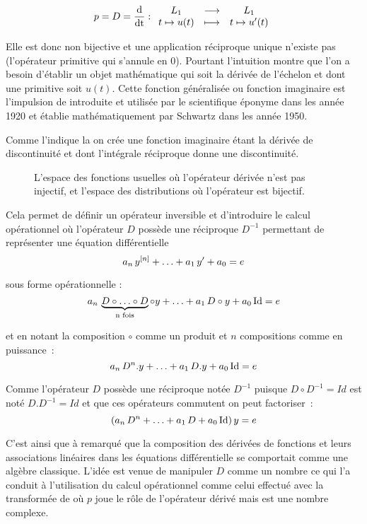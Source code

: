 \begin{equation}
  \label{eq:application_derivee}
  p=D=\frac{\mathrm{d{}}}{\mathrm{d{t}}} : \begin{array}{ccc} L_1 & \longrightarrow & L_1 \\ t\mapsto u(t) & \longmapsto & t\mapsto u'(t) \\ \end{array}
\end{equation}


Elle est donc non bijective et une application réciproque unique
n'existe pas (l'opérateur primitive qui s'annule en 0). Pourtant
l'intuition montre que l'on a besoin d'établir un objet mathématique
qui soit la dérivée de l'échelon et dont une primitive soit
$u(t)$. Cette fonction généralisée ou fonction imaginaire est
l'impulsion de \Dirac{} introduite et utilisée par le scientifique
éponyme dans les année 1920 et établie mathématiquement par Schwartz
dans les année 1950.

Comme l'indique la  on crée une
fonction imaginaire étant la dérivée de discontinuité et dont
l'intégrale réciproque donne une discontinuité.
\begin{figure}[ht!]
  \centering
  \caption{L'espace des fonctions usuelles où l'opérateur dérivée n'est pas injectif, et l'espace des distributions où l'opérateur est bijectif. }
  \label{fig:fonctions_et_distributions}
\end{figure}


Cela permet de définir un opérateur inversible et d'introduire le
calcul opérationnel où l'opérateur $D$ possède une réciproque $D^{-1}$
permettant de représenter une équation différentielle
$$
 a_n\,y^{\left[n\right]}+\ldots+a_1\,y'+a_0 = e
$$

sous forme opérationnelle :
$$
 a_n\,\underbrace{D\circ\ldots\circ D}_{\text{n fois}}\circ y + \ldots +a_1\, D\circ y + a_0\, \mathrm{Id} = e
$$

et en notant la composition $\circ$ comme un produit et $n$
compositions comme en puissance~:
$$
 a_n\,D^n.y + \ldots +a_1\, D . y + a_0 \,\mathrm{Id} = e
$$

Comme l'opérateur $D$ possède une réciproque notée $D^{-1}$ puisque $D\circ D^{-1}= Id$ est noté $D.D^{-1}=Id$ et que ces opérateurs commutent on peut factoriser~:
$$
 \left(a_n\,D^n + \ldots +a_1\, D  + a_0 \,\mathrm{Id}\right) y = e
$$

C'est ainsi que \Heaviside{} à remarqué que la composition des
dérivées de fonctions et leurs associations linéaires dans les
équations différentielle se comportait comme une algèbre
classique. L'idée est venue de manipuler $D$ comme un nombre ce qui
l'a conduit à l'utilisation du calcul opérationnel comme celui
effectué avec la transformée de \Laplace{} où $p$ joue le rôle de
l'opérateur dérivé mais est une nombre complexe.

